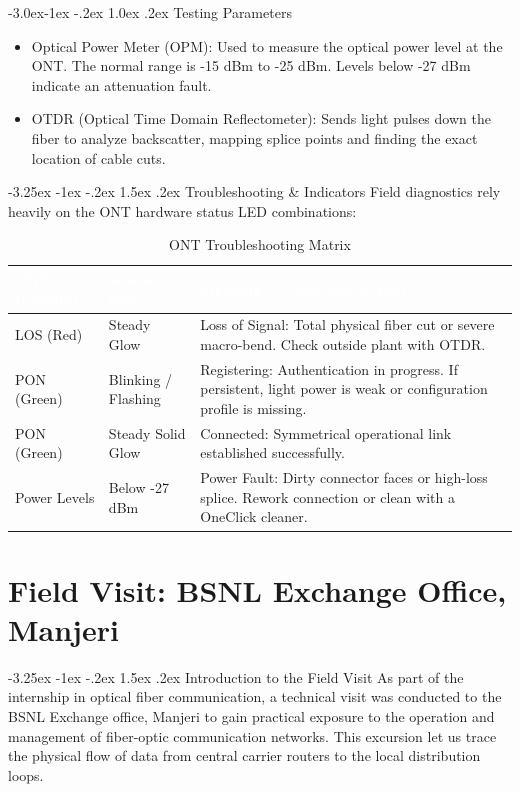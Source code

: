 \documentclass[11pt,a4paper]{report}
\makeatletter
\renewcommand{\section}{\@startsection{section}{1}{\z@}%
  {-3.25ex \@plus -1ex \@minus -.2ex}%
  {1.5ex \@plus.2ex}%
  {\normalfont\Large\bfseries\color{primaryColor}}}
\renewcommand{\subsection}{\@startsection{subsection}{2}{\z@}%
  {-3.0ex\@plus -1ex \@minus -.2ex}%
  {1.0ex \@plus .2ex}%
  {\normalfont\large\bfseries\color{secondaryColor}}}
\makeatother
\begin{document}
\subsection{Testing Parameters}
\begin{itemize}
  \item Optical Power Meter (OPM): Used to measure the optical power level at the ONT. The normal range is -15 dBm to -25 dBm. Levels below -27 dBm indicate an attenuation fault.
  \item OTDR (Optical Time Domain Reflectometer): Sends light pulses down the fiber to analyze backscatter, mapping splice points and finding the exact location of cable cuts.
\end{itemize}
\section{Troubleshooting \& Indicators}
Field diagnostics rely heavily on the ONT hardware status LED combinations:
\begin{table}[H]
\centering
\begin{tabularx}{\textwidth}{l l X}
\rowcolor{primaryColor}
\textcolor{white}{\textbf{ONT Indicator}} & \textcolor{white}{\textbf{Status State}} & \textcolor{white}{\textbf{Meaning / Corrective Action}} \\
\midrule
LOS (Red) & Steady Glow & Loss of Signal: Total physical fiber cut or severe macro-bend. Check outside plant with OTDR. \\
PON (Green) & Blinking / Flashing & Registering: Authentication in progress. If persistent, light power is weak or configuration profile is missing. \\
PON (Green) & Steady Solid Glow & Connected: Symmetrical operational link established successfully. \\
Power Levels & Below -27 dBm & Power Fault: Dirty connector faces or high-loss splice. Rework connection or clean with a OneClick cleaner. \\
\bottomrule
\end{tabularx}
\caption{ONT Troubleshooting Matrix}
\end{table}
\chapter{Field Visit: BSNL Exchange Office, Manjeri}
\section{Introduction to the Field Visit}
As part of the internship in optical fiber communication, a technical visit was conducted to the BSNL Exchange office, Manjeri to gain practical exposure to the operation and management of fiber-optic communication networks. This excursion let us trace the physical flow of data from central carrier routers to the local distribution loops.
\end{document}

